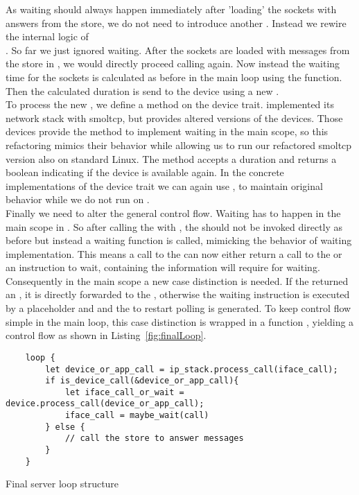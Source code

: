 As waiting should always happen immediately after 'loading' the sockets with answers from the store, we do not need to introduce another . Instead we rewire the internal logic of \\ . So far we just ignored waiting. After the sockets are loaded with messages from the store in , we would directly proceed calling  again. Now instead the waiting time for the sockets is calculated as before in the main loop using the  function. Then the calculated duration is send to the device using a new . \\

To process the new , we define a method  on the device trait. \md implemented its network stack with smoltcp, but provides altered versions of the devices. Those devices provide the  method to implement waiting in the main scope, so this refactoring mimics their behavior while allowing us to run our refactored smoltcp version also on standard Linux. The method accepts a duration and returns a boolean indicating if the device is available again. In the concrete implementations of the device trait we can again use , to maintain original behavior while we do not run on \md. \\

Finally we need to alter the general control flow. Waiting has to happen in the main scope in \md. So after calling the \dev{} with , the \stack{} should not be invoked directly as before but instead a waiting function is called, mimicking the behavior of \md waiting implementation. This means a call to the \dev{} can now either return a call to the \stack{} or an instruction to wait, containing the information \md will require for waiting. Consequently in the main scope a new case distinction is needed. If the \dev{} returned an , it is directly forwarded to the \stack{}, otherwise the waiting instruction is executed by a placeholder and and the  to restart polling is generated. To keep control flow simple in the main loop, this case distinction is wrapped in a function , yielding a control flow as shown in Listing~\ref{fig:finalLoop}.
\begin{codefigure}
\begin{verbatim}
    loop {
        let device_or_app_call = ip_stack.process_call(iface_call);
        if is_device_call(&device_or_app_call){
            let iface_call_or_wait = device.process_call(device_or_app_call);
            iface_call = maybe_wait(call)
        } else {
            // call the store to answer messages
        }
    }
\end{verbatim}
\caption{Final server loop structure}
\label{fig:finalLoop}
\end{codefigure}


